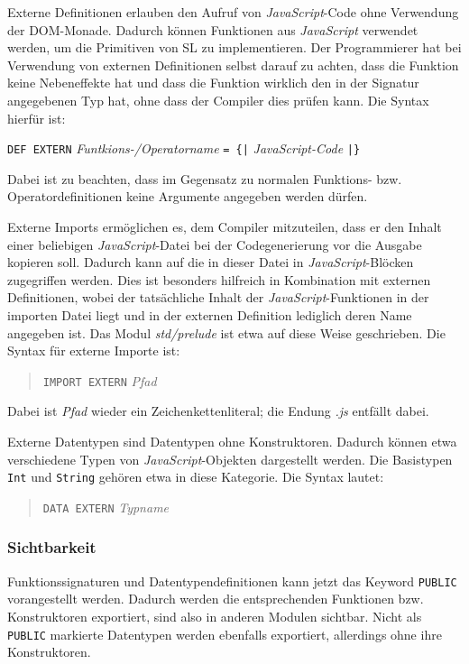 \documentclass[runningheads]{llncs}
\begin{document}
Externe Definitionen erlauben den Aufruf von \emph{JavaScript}-Code
ohne Verwendung der DOM-Monade. Dadurch können Funktionen aus
\emph{JavaScript} verwendet werden, um die Primitiven von SL zu
implementieren.  Der Programmierer hat bei Verwendung von externen
Definitionen selbst darauf zu achten, dass die Funktion keine
Nebeneffekte hat und dass die Funktion wirklich den in der Signatur
angegebenen Typ hat, ohne dass der Compiler dies prüfen kann.
Die Syntax hierfür ist:

\verb|DEF EXTERN| \emph{Funtkions-/Operatorname} \verb:= {|:
\emph{JavaScript-Code} \verb:|}:

Dabei ist zu beachten, dass im Gegensatz zu normalen Funktions-
bzw. Operatordefinitionen keine Argumente angegeben werden dürfen.

Externe Imports ermöglichen es, dem Compiler mitzuteilen, dass er den
Inhalt einer beliebigen \emph{JavaScript}-Datei bei der
Codegenerierung vor die Ausgabe kopieren soll. Dadurch kann auf die
in dieser Datei in \emph{JavaScript}-Blöcken zugegriffen werden.
Dies ist besonders hilfreich in Kombination mit externen Definitionen,
wobei der tatsächliche Inhalt der \emph{JavaScript}-Funktionen in der
importen Datei liegt und in der externen Definition lediglich deren
Name angegeben ist.  Das Modul \emph{std/prelude} ist etwa auf diese
Weise geschrieben. Die Syntax für externe Importe ist:

\begin{quote}
\verb|IMPORT EXTERN| \emph{Pfad}
\end{quote}

Dabei ist \emph{Pfad} wieder ein Zeichenkettenliteral; die Endung
\emph{.js} entfällt dabei.

Externe Datentypen sind Datentypen ohne Konstruktoren. Dadurch können
etwa verschiedene Typen von \emph{JavaScript}-Objekten dargestellt
werden.  Die Basistypen \verb|Int| und \verb|String| gehören etwa in
diese Kategorie.  Die Syntax lautet:

\begin{quote}
\verb|DATA EXTERN| \emph{Typname}
\end{quote}

\subsubsection{Sichtbarkeit}

Funktionssignaturen und Datentypendefinitionen kann jetzt das Keyword
\verb|PUBLIC| vorangestellt werden.  Dadurch werden die entsprechenden
Funktionen bzw. Konstruktoren exportiert, sind also in anderen Modulen
sichtbar.  Nicht als \verb|PUBLIC| markierte Datentypen werden
ebenfalls exportiert, allerdings ohne ihre Konstruktoren.
\end{document}
